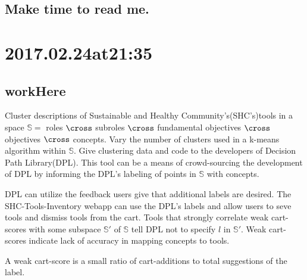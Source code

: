 \subsection*{ Make time to read me. }

\section*{ 2017.02.24at21:35 }
\subsection*{ workHere }
Cluster descriptions of Sustainable and Healthy Community's(SHC's)tools in a space $\mathbb{S}=$ roles $\cross$ subroles $\cross$ fundamental objectives $\cross$ objectives $\cross$ concepts. Vary the number of clusters used in a k-means algorithm within $\mathbb{S}$. Give clustering data and code to the developers of Decision Path Library(DPL). This tool can be a means of crowd-sourcing the development of DPL by informing the DPL's labeling of points in $\mathbb{S}$ with concepts.

DPL can utilize the feedback users give that additional labels are desired. The SHC-Tools-Inventory webapp can use the DPL's labels and allow users to seve tools and dismiss tools from the cart. Tools that strongly correlate weak cart-scores with some subspace $\mathbb{S}'$ of $\mathbb{S}$ tell DPL not to specify $l$ in $\mathbb{S}'$. Weak cart-scores indicate lack of accuracy in mapping concepts to tools. 

A weak cart-score is a small ratio of cart-additions to total suggestions of the label.
